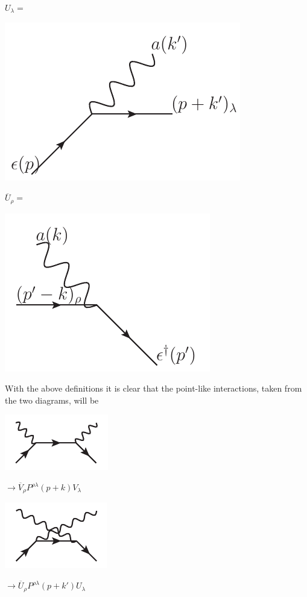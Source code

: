$U_\lambda = $
\begin{minipage}{1in}
   \includegraphics[scale=0.7]{eps/U-lambda} 
\end{minipage}
\hspace{8em}
$\overline{U}_\rho = $
\begin{minipage}{1in}
   \includegraphics[scale=0.7]{eps/U-bar-rho} 
\end{minipage}

With the above definitions it is clear that the point-like interactions, taken from the two diagrams, will be

\begin{minipage}{1in}
   \includegraphics[scale=1]{eps/uncrossed-small} 
\end{minipage}
$ \to \overline{V}_\rho P^{\rho \lambda}(p+k) V_\lambda$
\hspace{5em}
\begin{minipage}{1in}
   \includegraphics[scale=1]{eps/crossed-small} 
\end{minipage}
$ \to \overline{U}_\rho P^{\rho \lambda}(p+k') U_\lambda$



